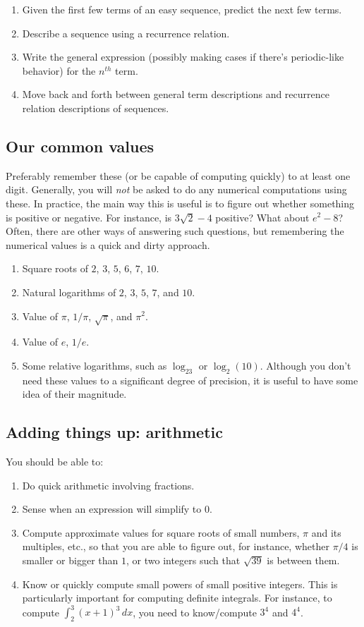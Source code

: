 \documentclass[10pt]{amsart}
\begin{document}
\begin{enumerate}
\item Given the first few terms of an easy sequence, predict the next
  few terms.
\item Describe a sequence using a recurrence relation.
\item Write the general expression (possibly making cases if there's
  periodic-like behavior) for the $n^{th}$ term.
\item Move back and forth between general term descriptions and
  recurrence relation descriptions of sequences.
\end{enumerate}

\subsection{Our common values}

Preferably remember these (or be capable of computing quickly) to at
least one digit. Generally, you will {\em not} be asked to do any
numerical computations using these. In practice, the main way this is
useful is to figure out whether something is positive or negative. For
instance, is $3\sqrt{2} - 4$ positive? What about $e^2 - 8$? Often,
there are other ways of answering such questions, but remembering the
numerical values is a quick and dirty approach.

\begin{enumerate}
\item Square roots of $2$, $3$, $5$, $6$, $7$, $10$.
\item Natural logarithms of $2$, $3$, $5$, $7$, and $10$.
\item Value of $\pi$, $1/\pi$, $\sqrt{\pi}$, and $\pi^2$.
\item Value of $e$, $1/e$.
\item Some relative logarithms, such as $\log_23$ or
  $\log_2(10)$. Although you don't need these values to a significant
  degree of precision, it is useful to have some idea of their
  magnitude.
\end{enumerate}

\subsection{Adding things up: arithmetic}

You should be able to:

\begin{enumerate}
\item Do quick arithmetic involving fractions.
\item Sense when an expression will simplify to $0$.
\item Compute approximate values for square roots of small numbers,
  $\pi$ and its multiples, etc., so that you are able to figure out,
  for instance, whether $\pi/4$ is smaller or bigger than $1$, or two
  integers such that $\sqrt{39}$ is between them.
\item Know or quickly compute small powers of small positive
  integers. This is particularly important for computing definite
  integrals. For instance, to compute $\int_2^3 (x + 1)^3 \, dx$, you
  need to know/compute $3^4$ and $4^4$.
\end{enumerate}
\end{document}
